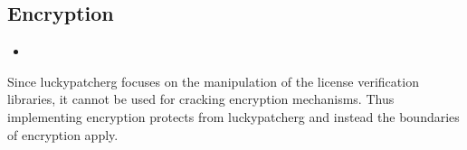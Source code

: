 \subsection{Encryption} \label{section:counter-replace-encryption}




\begin{itemize}
  \item
\end{itemize}
Since \gls{luckypatcherg} focuses on the manipulation of the license verification libraries, it cannot be used for cracking encryption mechanisms.
Thus implementing encryption protects from \gls{luckypatcherg} and instead the boundaries of encryption apply.
